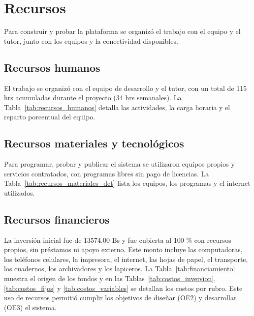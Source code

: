 \section{Recursos}
\label{sec:recursos}

Para construir y probar la plataforma se organizó el trabajo con el equipo y el tutor, junto con los equipos y la conectividad disponibles.

\subsection{Recursos humanos}

El trabajo se organizó con el equipo de desarrollo y el tutor, con un total de 115 hrs acumuladas durante el proyecto (34 hrs semanales). La Tabla~\ref{tab:recursos_humanos} detalla las actividades, la carga horaria y el reparto porcentual del equipo.



\subsection{Recursos materiales y tecnológicos}

Para programar, probar y publicar el sistema se utilizaron equipos propios y servicios contratados, con programas libres sin pago de licencias. La Tabla~\ref{tab:recursos_materiales_det} lista los equipos, los programas y el internet utilizados.



\subsection{Recursos financieros}

La inversión inicial fue de 13574.00 Bs y fue cubierta al 100 \% con recursos propios, sin préstamos ni apoyo externo. Este monto incluye las computadoras, los teléfonos celulares, la impresora, el internet, las hojas de papel, el transporte, los cuadernos, los archivadores y los lapiceros. La Tabla~\ref{tab:financiamiento} muestra el origen de los fondos y en las Tablas~\ref{tab:costos_inversion}, \ref{tab:costos_fijos} y \ref{tab:costos_variables} se detallan los costos por rubro. Este uso de recursos permitió cumplir los objetivos de diseñar (OE2) y desarrollar (OE3) el sistema.


